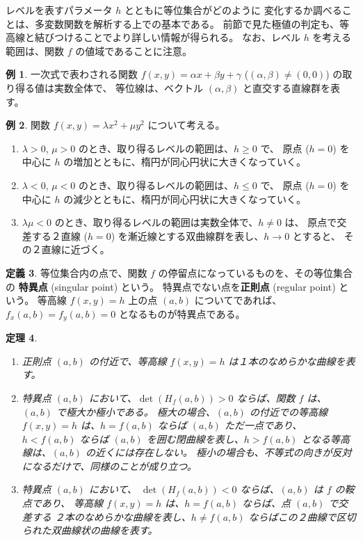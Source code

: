 \documentclass[a4paper]{jsarticle}
\newtheorem{Theorem}{定理}[section]
\theoremstyle{definition}
\newtheorem{Definition}[Theorem]{定義}
\newtheorem{Example}[Theorem]{例}
\theoremstyle{remark}
\begin{document}
レベルを表すパラメータ $h$ とともに等位集合がどのように
変化するか調べることは、多変数関数を解析する上での基本である。
前節で見た極値の判定も、等高線と結びつけることでより詳しい情報が得られる。
なお、レベル $h$ を考える範囲は、関数 $f$ の値域であることに注意。

\begin{Example}
一次式で表わされる関数 $f(x,y) = \alpha x+ \beta y + \gamma$ ($(\alpha,\beta) \not= (0,0)$) の取り得る値は実数全体で、
等位線は、ベクトル $(\alpha,\beta)$ と直交する直線群を表す。
\end{Example} 

\begin{Example}
関数 $f(x,y) = \lambda x^2 + \mu y^2$ について考える。
\begin{enumerate}
\item 
$\lambda>0$, $\mu > 0$ のとき、取り得るレベルの範囲は、$h \geq 0$ で、
原点 ($h=0$) を中心に $h$ の増加とともに、楕円が同心円状に大きくなっていく。
\item 
$\lambda < 0$, $\mu < 0$ のとき、取り得るレベルの範囲は、$h \leq 0$ で、
原点 ($h=0$) を中心に $h$ の減少とともに、楕円が同心円状に大きくなっていく。
\item 
$\lambda \mu < 0$ のとき、取り得るレベルの範囲は実数全体で、$h \not= 0$ は、
原点で交差する２直線 ($h=0$) を漸近線とする双曲線群を表し、$h \to 0$ とすると、
その２直線に近づく。
\end{enumerate}
\end{Example} 

\begin{Definition}
等位集合内の点で、関数 $f$ の停留点になっているものを、その等位集合の
{\bf 特異点} (singular point) という。
特異点でない点を{\bf 正則点} (regular point) という。
等高線 $f(x,y) = h$ 上の点 $(a,b)$ についてであれば、
$f_x(a,b) = f_y(a,b) = 0$ 
となるものが特異点である。
\end{Definition}

\begin{Theorem}~
\begin{enumerate}
\item
正則点 $(a,b)$ の付近で、等高線 $f(x,y) = h$ は１本のなめらかな曲線を表す。
\item
特異点 $(a,b)$ において、$\det(H_f(a,b)) > 0$ ならば、関数 $f$ は、$(a,b)$ で極大か極小である。
極大の場合、$(a,b)$ の付近での等高線 $f(x,y) = h$ は、$h = f(a,b)$ ならば $(a,b)$ ただ一点であり、
$h < f(a,b)$ ならば $(a,b)$ を囲む閉曲線を表し、$h>f(a,b)$ となる等高線は、$(a,b)$ の近くには存在しない。
極小の場合も、不等式の向きが反対になるだけで、同様のことが成り立つ。
\item 
特異点 $(a,b)$ において、
$\det(H_f(a,b)) < 0$ ならば、$(a,b)$ は $f$ の鞍点であり、
等高線 $f(x,y) = h$ は、$h= f(a,b)$ ならば、点 $(a,b)$ で交差する
２本のなめらかな曲線を表し、$h \not= f(a,b)$ ならばこの２曲線で区切られた双曲線状の曲線を表す。
\end{enumerate}
\end{Theorem}
\end{document}
